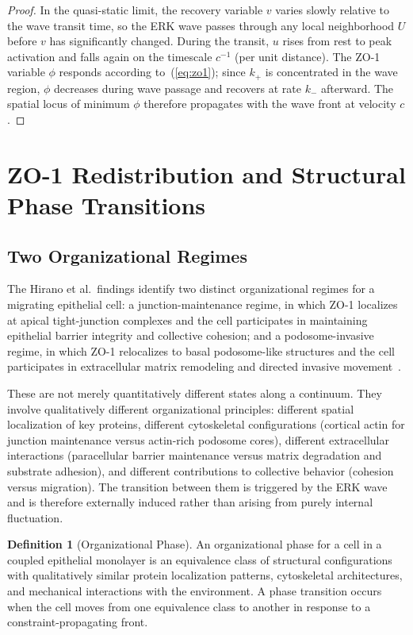 \documentclass[11pt,a4paper]{article}
\theoremstyle{plain}
\theoremstyle{definition}
\newtheorem{definition}[theorem]{Definition}
\begin{document}
\begin{proof}
In the quasi-static limit, the recovery variable $v$ varies slowly relative to the
wave transit time, so the ERK wave passes through any local neighborhood $U$ before
$v$ has significantly changed. During the transit, $u$ rises from rest to peak activation
and falls again on the timescale $c^{-1}$ (per unit distance). The ZO-1 variable $\phi$
responds according to~(\ref{eq:zo1}); since $k_+$ is concentrated in the wave region,
$\phi$ decreases during wave passage and recovers at rate $k_-$ afterward. The spatial
locus of minimum $\phi$ therefore propagates with the wave front at velocity $c$.
\end{proof}

\section{ZO-1 Redistribution and Structural Phase Transitions}
\label{sec:phase}

\subsection{Two Organizational Regimes}

The Hirano et al.\ findings identify two distinct organizational regimes for a migrating
epithelial cell: a junction-maintenance regime, in which ZO-1 localizes at apical
tight-junction complexes and the cell participates in maintaining epithelial barrier
integrity and collective cohesion; and a podosome-invasive regime, in which ZO-1
relocalizes to basal podosome-like structures and the cell participates in extracellular
matrix remodeling and directed invasive movement~\cite{Hirano2026}.

These are not merely quantitatively different states along a continuum. They involve
qualitatively different organizational principles: different spatial localization of
key proteins, different cytoskeletal configurations (cortical actin for junction
maintenance versus actin-rich podosome cores), different extracellular interactions
(paracellular barrier maintenance versus matrix degradation and substrate adhesion),
and different contributions to collective behavior (cohesion versus migration).
The transition between them is triggered by the ERK wave and is therefore externally
induced rather than arising from purely internal fluctuation.

\begin{definition}[Organizational Phase]
An organizational phase for a cell in a coupled epithelial monolayer is an equivalence
class of structural configurations with qualitatively similar protein localization patterns,
cytoskeletal architectures, and mechanical interactions with the environment. A phase
transition occurs when the cell moves from one equivalence class to another in response
to a constraint-propagating front.
\end{definition}
\end{document}
